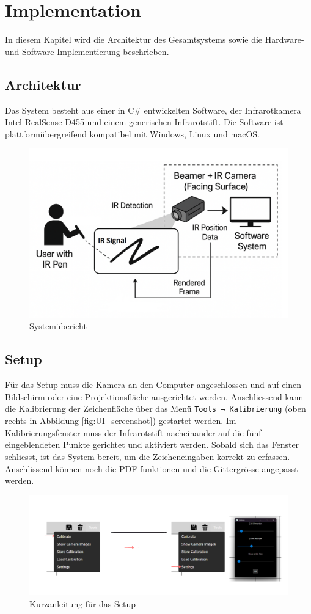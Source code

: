 \section{Implementation}
In diesem Kapitel wird die Architektur des Gesamtsystems sowie die Hardware- und Software-Implementierung beschrieben.

\subsection{Architektur}
Das System besteht aus einer in C\# entwickelten Software, der Infrarotkamera Intel RealSense D455 und einem generischen Infrarotstift. Die Software ist plattformübergreifend kompatibel mit Windows, Linux und macOS.

\begin{figure}[H]
    \centering
    \includegraphics[width=0.5\linewidth]{graphics/system_uebersicht.png}
    \caption{Systemübericht}
    \label{fig:enter-label}
\end{figure}

\subsection{Setup}

Für das Setup muss die Kamera an den Computer angeschlossen und auf einen Bildschirm oder eine Projektionsfläche ausgerichtet werden. Anschliessend kann die Kalibrierung der Zeichenfläche über das Menü \texttt{Tools~→~Kalibrierung} (oben rechts in Abbildung \ref{fig:UI_screenshot}) gestartet werden. Im Kalibrierungsfenster muss der Infrarotstift nacheinander auf die fünf eingeblendeten Punkte gerichtet und aktiviert werden. Sobald sich das Fenster schliesst, ist das System bereit, um die Zeicheneingaben korrekt zu erfassen. Anschlissend können noch die PDF funktionen und die Gittergrösse angepasst werden.

\begin{figure}[H]
    \centering
    \includegraphics[width=0.8\linewidth]{graphics/anleitung_setup.png}
    \caption{Kurzanleitung für das Setup}
    \label{fig:anleitung_setup}
\end{figure}

